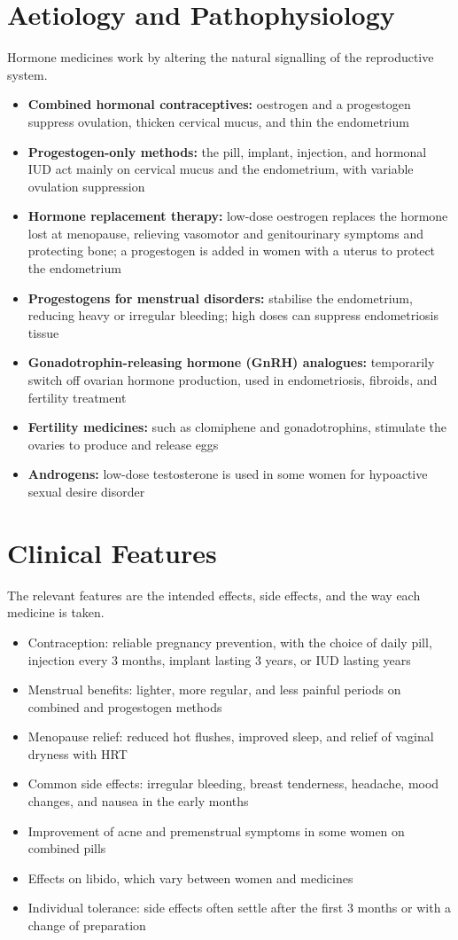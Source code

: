 \section*{Aetiology and Pathophysiology}
Hormone medicines work by altering the natural signalling of the reproductive system.
\begin{itemize}
    \item \textbf{Combined hormonal contraceptives:} oestrogen and a progestogen suppress ovulation, thicken cervical mucus, and thin the endometrium
    \item \textbf{Progestogen-only methods:} the pill, implant, injection, and hormonal IUD act mainly on cervical mucus and the endometrium, with variable ovulation suppression
    \item \textbf{Hormone replacement therapy:} low-dose oestrogen replaces the hormone lost at menopause, relieving vasomotor and genitourinary symptoms and protecting bone; a progestogen is added in women with a uterus to protect the endometrium
    \item \textbf{Progestogens for menstrual disorders:} stabilise the endometrium, reducing heavy or irregular bleeding; high doses can suppress endometriosis tissue
    \item \textbf{Gonadotrophin-releasing hormone (GnRH) analogues:} temporarily switch off ovarian hormone production, used in endometriosis, fibroids, and fertility treatment
    \item \textbf{Fertility medicines:} such as clomiphene and gonadotrophins, stimulate the ovaries to produce and release eggs
    \item \textbf{Androgens:} low-dose testosterone is used in some women for hypoactive sexual desire disorder
\end{itemize}

\section*{Clinical Features}
The relevant features are the intended effects, side effects, and the way each medicine is taken.
\begin{itemize}
    \item Contraception: reliable pregnancy prevention, with the choice of daily pill, injection every 3 months, implant lasting 3 years, or IUD lasting years
    \item Menstrual benefits: lighter, more regular, and less painful periods on combined and progestogen methods
    \item Menopause relief: reduced hot flushes, improved sleep, and relief of vaginal dryness with HRT
    \item Common side effects: irregular bleeding, breast tenderness, headache, mood changes, and nausea in the early months
    \item Improvement of acne and premenstrual symptoms in some women on combined pills
    \item Effects on libido, which vary between women and medicines
    \item Individual tolerance: side effects often settle after the first 3 months or with a change of preparation
\end{itemize}

